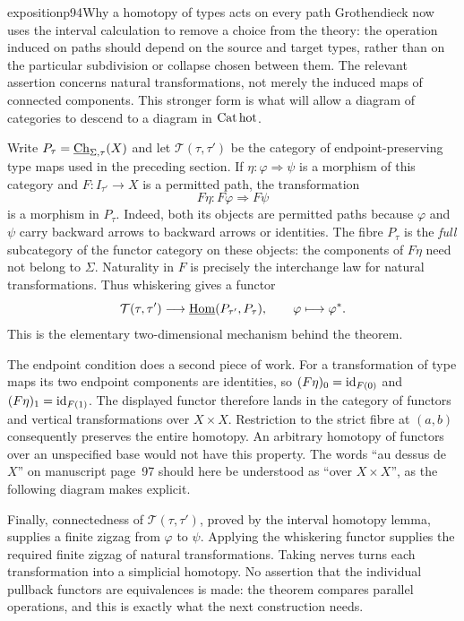 \begin{dcomment}{exposition}{p94}{Why a homotopy of types acts on every path}
Grothendieck now uses the interval calculation to remove a choice from the theory: the operation induced on paths should depend on the source and target types, rather than on the particular subdivision or collapse chosen between them. The relevant assertion concerns natural transformations, not merely the induced maps of connected components. This stronger form is what will allow a diagram of categories to descend to a diagram in $\mathrm{Cat\,hot}$.

Write $P_\tau=\underline{\mathrm{Ch}}_{\Sigma,\tau}(X)$ and let $\mathcal T(\tau,\tau')$ be the category of endpoint-preserving type maps used in the preceding section. If $\eta:\varphi\Rightarrow\psi$ is a morphism of this category and $F:I_{\tau'}\to X$ is a permitted path, the transformation
\[
 F\eta:F\varphi\Longrightarrow F\psi
\]
is a morphism in $P_\tau$. Indeed, both its objects are permitted paths because $\varphi$ and $\psi$ carry backward arrows to backward arrows or identities. The fibre $P_\tau$ is the \emph{full} subcategory of the functor category on these objects: the components of $F\eta$ need not belong to $\Sigma$. Naturality in $F$ is precisely the interchange law for natural transformations. Thus whiskering gives a functor
\[
 \mathcal T(\tau,\tau')\longrightarrow\underline{\mathrm{Hom}}(P_{\tau'},P_\tau),
 \qquad \varphi\longmapsto\varphi^*.
\]
This is the elementary two-dimensional mechanism behind the theorem.

The endpoint condition does a second piece of work. For a transformation of type maps its two endpoint components are identities, so $(F\eta)_0=\mathrm{id}_{F(0)}$ and $(F\eta)_1=\mathrm{id}_{F(1)}$. The displayed functor therefore lands in the category of functors and vertical transformations over $X\times X$. Restriction to the strict fibre at $(a,b)$ consequently preserves the entire homotopy. An arbitrary homotopy of functors over an unspecified base would not have this property. The words ``au dessus de $X$'' on manuscript page~97 should here be understood as ``over $X\times X$'', as the following diagram makes explicit.

Finally, connectedness of $\mathcal T(\tau,\tau')$, proved by the interval homotopy lemma, supplies a finite zigzag from $\varphi$ to $\psi$. Applying the whiskering functor supplies the required finite zigzag of natural transformations. Taking nerves turns each transformation into a simplicial homotopy. No assertion that the individual pullback functors are equivalences is made: the theorem compares parallel operations, and this is exactly what the next construction needs.
\end{dcomment}


